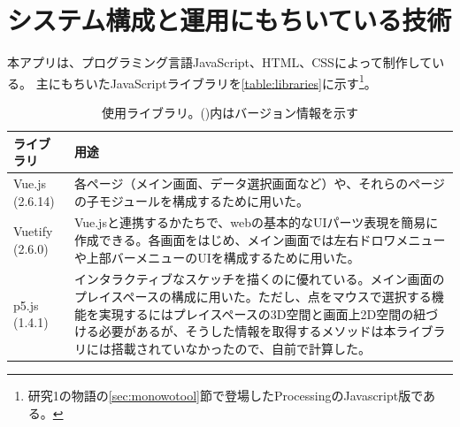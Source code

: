 \section{システム構成と運用にもちいている技術}

本アプリは、プログラミング言語JavaScript、HTML、CSSによって制作している。
主にもちいたJavaScriptライブラリを\autoref{table:libraries}に示す\footnote{
  研究1の物語の\ref{sec:monowotool}節で登場したProcessingのJavascript版である。
}。
\begin{table}[t]
  \begin{center}
  \caption{使用ライブラリ。()内はバージョン情報を示す}  
  \label{table:libraries}
  \begin{tabularx}{\textwidth}{l X}
    \hline
    \textbf{ライブラリ} & \textbf{用途} \\
    \hline
    Vue.js (2.6.14) &
    各ページ（メイン画面、データ選択画面など）や、それらのページの子モジュールを構成するために用いた。 \\
    Vuetify (2.6.0) &
    Vue.jsと連携するかたちで、webの基本的なUIパーツ表現を簡易に作成できる。各画面をはじめ、メイン画面では左右ドロワメニューや上部バーメニューのUIを構成するために用いた。 \\
    p5.js (1.4.1) &
    インタラクティブなスケッチを描くのに優れている。メイン画面のプレイスペースの構成に用いた。ただし、点をマウスで選択する機能を実現するにはプレイスペースの3D空間と画面上2D空間の紐づける必要があるが、そうした情報を取得するメソッドは本ライブラリには搭載されていなかったので、自前で計算した。 \\
    \hline
  \end{tabularx}
  \end{center}
\end{table}

